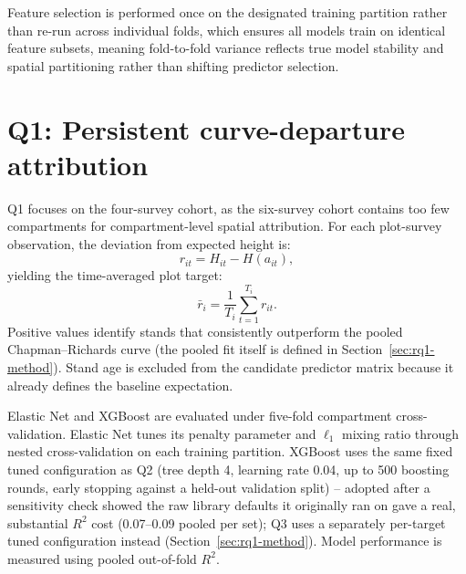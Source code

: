 \documentclass[logo,msc,ai]{infthesis}           %
\begin{document}
Feature selection is performed once on the designated training partition rather than re-run across individual folds, which ensures all models train on identical feature subsets, meaning fold-to-fold variance reflects true model stability and spatial partitioning rather than shifting predictor selection.

\section{Q1: Persistent curve-departure attribution}
\label{sec:rq2b-method}
\label{sec:q1-method}

Q1 focuses on the four-survey cohort, as the six-survey cohort contains too few compartments for compartment-level spatial attribution. For each plot-survey observation, the deviation from expected height is:
\begin{equation}
r_{it}=H_{it}-H(a_{it}),
\end{equation}
yielding the time-averaged plot target:
\begin{equation}
\bar r_i=\frac{1}{T_i}\sum_{t=1}^{T_i}r_{it}.
\label{eq:mean-cr-residual}
\end{equation}
Positive values identify stands that consistently outperform the pooled Chapman--Richards curve (the pooled fit itself is defined in Section~\ref{sec:rq1-method}). Stand age is excluded from the candidate predictor matrix because it already defines the baseline expectation.

Elastic Net and XGBoost are evaluated under five-fold compartment cross-validation. Elastic Net tunes its penalty parameter and $\ell_1$ mixing ratio through nested cross-validation on each training partition. XGBoost uses the same fixed tuned configuration as Q2 (tree depth 4, learning rate 0.04, up to 500 boosting rounds, early stopping against a held-out validation split) -- adopted after a sensitivity check showed the raw library defaults it originally ran on gave a real, substantial $R^2$ cost (0.07--0.09 pooled per set); Q3 uses a separately per-target tuned configuration instead (Section~\ref{sec:rq1-method}). Model performance is measured using pooled out-of-fold $R^2$.
\end{document}
